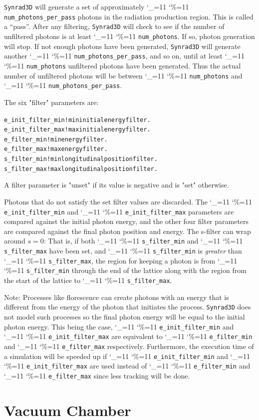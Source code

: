 \documentclass[11pt,openany]{report}
\newcommand{\srthree}{\texttt{Synrad3D}\xspace}
\newcommand\ttcmd{\begingroup\catcode`\_=11 \catcode`\%=11 \dottcmd}
\newcommand\dottcmd[1]{\texttt{#1}\endgroup}
\newcommand{\vn}{\ttcmd}
\newlength{\ExBeg}
\newlength{\ExEnd}
\newenvironment{example}
  {\vspace{\ExBeg} \begin{alltt}}
  {\end{alltt} \vspace{\ExEnd}}
\begin{document}
\srthree will generate a set of approximately \vn{num_photons_per_pass} photons in the
radiation production region.  This is called a ``pass''.  After any filtering, \srthree
will check to see if the number of unfiltered photons is at least \vn{num_photons}.  If
so, photon generation will stop. If not enough photons have been generated, \srthree will
generate another \vn{num_photons_per_pass}, and so on, until at least \vn{num_photons}
unfiltered photons have been generated. Thus the actual number of unfiltered photons
will be between \vn{num_photons} and \vn{num_photons_per_pass}.

The six "filter" parameters are:
\begin{example}
  e_init_filter_min   ! min initial energy filter.
  e_init_filter_max   ! max initial energy filter.
  e_filter_min        ! min energy filter.
  e_filter_max        ! max energy filter.
  s_filter_min        ! min longitudinal position filter.
  s_filter_max        ! max longitudinal position filter.
\end{example}
A filter parameter is "unset" if its value is negative and is "set"
otherwise.

Photons that do not satisfy the set filter values are discarded. The
\vn{e_init_filter_min} and \vn{e_init_filter_max} parameters are 
compared against the initial photon energy, and the other four
filter parameters are compared against the final photon position and
energy. The s-filter can wrap around $s = 0$: That is,
if both \vn{s_filter_min} and \vn{s_filter_max} have been set,
and \vn{s_filter_min} is {\em greater} than \vn{s_filter_max}, the region
for keeping a photon is from \vn{s_filter_min} through the end of the
lattice along with the region from the start of the lattice to
\vn{s_filter_max}.

Note: Processes like florescence can create photons with an energy that is different
from the energy of the photon that initiates the process. \srthree does not model such
processes so the final photon energy will be equal to the initial photon energy. This
being the case, \vn{e_init_filter_min} and \vn{e_init_filter_max} are equivalent to
\vn{e_filter_min} and \vn{e_filter_max} respectively. Furthermore, the execution time of a
simulation will be speeded up if \vn{e_init_filter_min} and \vn{e_init_filter_max} are
used instead of \vn{e_filter_min} and \vn{e_filter_max} since less tracking will be done.

\chapter{Vacuum Chamber} 
\label{s:vac.chamber}
\end{document}
